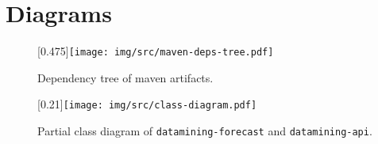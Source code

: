 \chapter{Diagrams}
\begin{figure}[H]
    \begin{center}
        \scalebox{0.34}[0.475]{\texttt{[image: img/src/maven-deps-tree.pdf]}}
        \caption{Dependency tree of maven artifacts.}
        \label{appen:maven-deps}
    \end{center}
\end{figure}

\begin{figure}[H]
    \begin{center}
        \scalebox{0.35}[0.21]{\texttt{[image: img/src/class-diagram.pdf]}}
        \caption{Partial class diagram of \texttt{datamining-forecast} and \texttt{datamining-api}.}
        \label{appen:class-diagram}
    \end{center}
\end{figure}

